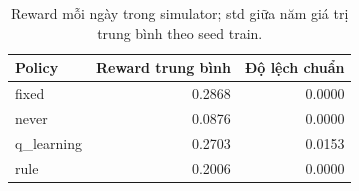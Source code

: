 \begin{table}[H]\centering\small
\caption{Reward mỗi ngày trong simulator; std giữa năm giá trị trung bình theo seed train.}
\begin{tabular}{@{}lrr@{}}\toprule
Policy & Reward trung bình & Độ lệch chuẩn \\\midrule
fixed & 0.2868 & 0.0000 \\
never & 0.0876 & 0.0000 \\
q\_learning & 0.2703 & 0.0153 \\
rule & 0.2006 & 0.0000 \\
\bottomrule\end{tabular}
\end{table}